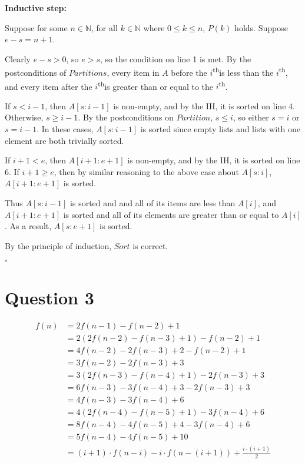 \documentclass[12pt]{article}
\newcommand{\N}{\mathbb{N}}
\newcommand{\supth}{\textsuperscript{th}}
\begin{document}
\noindent \textbf{Inductive step:}

Suppose for some $n \in \N$, for all $k \in \N$ where $0 \leq k \leq n$, $P(k)$ holds. Suppose $e - s = n + 1$.

Clearly $e - s > 0$, so $e > s$, so the condition on line 1 is met. By the postconditions of $Partitions$, every item in $A$ before the $i$\supth is less than the $i$\supth, and every item after the $i$\supth is greater than or equal to the $i$\supth.

If $s < i-1$, then $A[s:i-1]$ is non-empty, and by the IH, it is sorted on line 4. Otherwise, $s \geq i - 1$. By the postconditions on $Partition$, $s \leq i$, so either $s = i$ or $s = i - 1$. In these cases, $A[s:i-1]$ is sorted since empty lists and lists with one element are both trivially sorted.

If $i+1 < e$, then $A[i+1:e+1]$ is non-empty, and by the IH, it is sorted on line 6. If $i+1 \geq e$, then by similar reasoning to the above case about $A[s:i]$, $A[i+1:e+1]$ is sorted.

Thus $A[s:i-1]$ is sorted and and all of its items are less than $A[i]$, and $A[i+1:e+1]$ is sorted and all of its elements are greater than or equal to $A[i]$. As a result, $A[s:e+1]$ is sorted.

By the principle of induction, $Sort$ is correct.

\hfill $\square$


\newpage
\section*{Question 3}

\begin{align*}
    f(n) &= 2f(n-1) - f(n-2) + 1 \tag{$i = 1$} \\
    &= 2(2f(n-2) - f(n-3) + 1) - f(n-2) + 1 \\
    &= 4f(n-2) - 2f(n-3) + 2 - f(n-2) + 1 \\
    &= 3f(n-2) - 2f(n-3) + 3 \tag{$i = 2$} \\
    &= 3(2f(n-3) - f(n-4) + 1) - 2f(n-3) + 3 \\
    &= 6f(n-3) - 3f(n-4) + 3 - 2f(n-3) + 3 \\
    &= 4f(n-3) - 3f(n-4) + 6 \tag{$i = 3$} \\
    &= 4(2f(n-4) - f(n-5) + 1) - 3f(n-4) + 6 \\
    &= 8f(n-4) - 4f(n-5) + 4 - 3f(n-4) + 6 \\
    &= 5f(n-4) - 4f(n-5) + 10 \tag{$i = 4$} \\
    &= (i+1) \cdot f(n-i) - i \cdot f(n-(i+1)) + \frac{i \cdot (i+1)}{2}\tag{in terms of $i$}
\end{align*}
\end{document}
